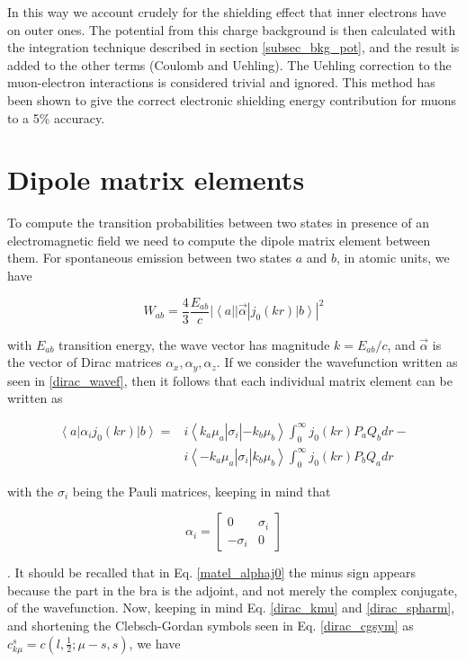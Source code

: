 \documentclass[]{report}
\newcommand{\bra}[1]{\left<#1\right|}
\newcommand{\ket}[1]{\left|#1\right>}
\newcommand{\braket}[3]{\bra{#1}#2\ket{#3}}
\begin{document}
In this way we account crudely for the shielding effect that inner electrons have on outer ones. The potential from this charge background is then calculated with the integration technique described in section \ref{subsec_bkg_pot}, and the result is added to the other terms (Coulomb and Uehling). The Uehling correction to the muon-electron interactions is considered trivial and ignored. This method has been shown to give the correct electronic shielding energy contribution for muons to a 5\% accuracy.

\section{Dipole matrix elements}

To compute the transition probabilities between two states in presence of an electromagnetic field we need to compute the dipole matrix element between them. For spontaneous emission between two states $a$ and $b$, in atomic units, we have \cite{payne1955}

\begin{equation}\label{trans_prob}
W_{ab} = \frac{4}{3}\frac{E_{ab}}{c}|\braket{a}{|\vec{\alpha}|j_0(kr)}{b}|^2
\end{equation}

with $E_{ab}$ transition energy, the wave vector has magnitude $k=E_{ab}/c$, and $\vec{\alpha}$ is the vector of Dirac matrices $\alpha_x, \alpha_y, \alpha_z$.
If we consider the wavefunction written as seen in \ref{dirac_wavef}, 
then it follows that each individual matrix element can be written as

\begin{align}\label{matel_alphaj0}
\braket{a}{\alpha_ij_0(kr)}{b} = & i\braket{k_a\mu_a}{\sigma_i}{-k_b\mu_b}\int_{0}^{\infty}j_0(kr)P_aQ_b dr - \\
& i\braket{-k_a\mu_a}{\sigma_i}{k_b\mu_b}\int_{0}^{\infty}j_0(kr)P_bQ_a dr \nonumber
\end{align}

with the $\sigma_i$ being the Pauli matrices, keeping in mind that

\begin{equation}
\alpha_i = \begin{bmatrix}
0 & \sigma_i \\
-\sigma_i & 0
\end{bmatrix}
\end{equation}

. It should be recalled that in Eq. \ref{matel_alphaj0} the minus sign appears because the part in the bra is the adjoint, and not merely the complex conjugate, of the wavefunction. Now, keeping in mind Eq. \ref{dirac_kmu} and \ref{dirac_spharm}, and shortening the Clebsch-Gordan symbols seen in Eq. \ref{dirac_cgsym} as $c_{k\mu}^s = c(l,\frac{1}{2};\mu-s, s)$, we have
\end{document}
